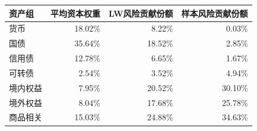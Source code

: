 \begin{tabular}{lrrr}
\toprule
资产组 & 平均资本权重 & LW风险贡献份额 & 样本风险贡献份额\\\midrule
货币 & 18.02\% & 8.22\% & 0.03\%\\
国债 & 35.64\% & 18.52\% & 2.85\%\\
信用债 & 12.78\% & 6.65\% & 1.67\%\\
可转债 & 2.54\% & 3.52\% & 4.94\%\\
境内权益 & 7.95\% & 20.52\% & 30.10\%\\
境外权益 & 8.04\% & 17.68\% & 25.78\%\\
商品相关 & 15.03\% & 24.88\% & 34.63\%\\
\bottomrule
\end{tabular}